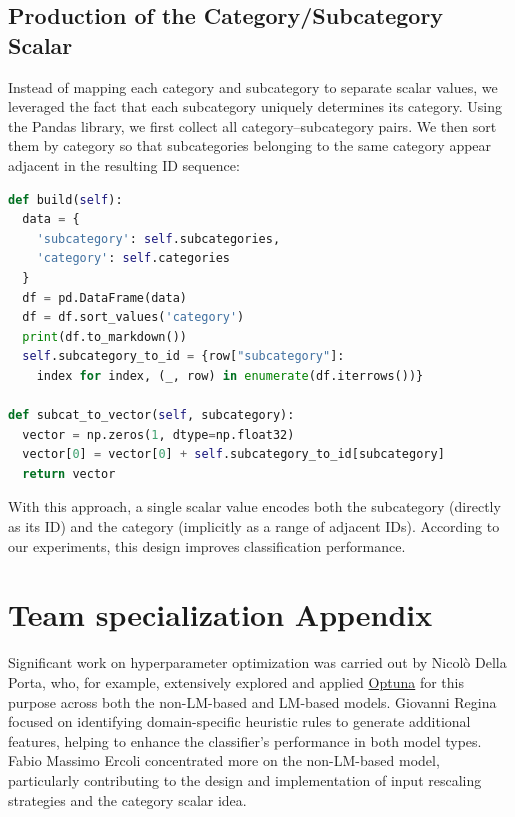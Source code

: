 \documentclass[11pt]{article}
\begin{document}
\subsection{Production of the Category/Subcategory Scalar}
Instead of mapping each category and subcategory to separate scalar values, we leveraged the fact that each subcategory uniquely determines its category. Using the Pandas library, we first collect all category–subcategory pairs. We then sort them by category so that subcategories belonging to the same category appear adjacent in the resulting ID sequence:
\scriptsize
	\begin{lstlisting}[language=python]	
def build(self):
  data = {
    'subcategory': self.subcategories,
    'category': self.categories
  }
  df = pd.DataFrame(data)
  df = df.sort_values('category')
  print(df.to_markdown())
  self.subcategory_to_id = {row["subcategory"]: 
    index for index, (_, row) in enumerate(df.iterrows())}

def subcat_to_vector(self, subcategory):
  vector = np.zeros(1, dtype=np.float32)
  vector[0] = vector[0] + self.subcategory_to_id[subcategory]
  return vector
	\end{lstlisting}
\normalsize
With this approach, a single scalar value encodes both the subcategory (directly as its ID) and the category (implicitly as a range of adjacent IDs). According to our experiments, this design improves classification performance.
	
\section{Team specialization Appendix}
\label{sec:appendix}
Significant work on hyperparameter optimization was carried out by Nicolò Della Porta, who, for example, extensively explored and applied \href{https://optuna.org/}{Optuna}  for this purpose across both the non-LM-based and LM-based models. Giovanni Regina focused on identifying domain-specific heuristic rules to generate additional features, helping to enhance the classifier’s performance in both model types. Fabio Massimo Ercoli concentrated more on the non-LM-based model, particularly contributing to the design and implementation of input rescaling strategies and the category scalar idea.
\end{document}
